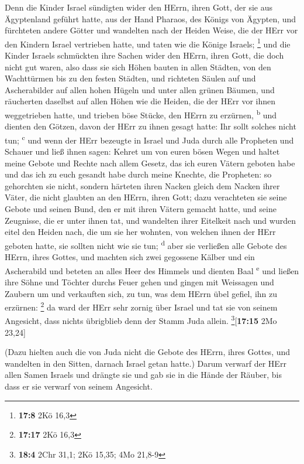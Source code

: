  Denn die Kinder Israel sündigten wider den HErrn, ihren
Gott, der sie aus Ägyptenland geführt hatte, aus der Hand Pharaos, des
Königs von Ägypten, und fürchteten andere Götter  und
wandelten nach der Heiden Weise, die der HErr vor den Kindern Israel
vertrieben hatte, und taten wie die Könige Israels; \footnote{\textbf{17:8}
  2Kö 16,3}  und die Kinder Israels schmückten ihre Sachen
wider den HErrn, ihren Gott, die doch nicht gut waren, also dass sie
sich Höhen bauten in allen Städten, von den Wachttürmen bis zu den
festen Städten,  und richteten Säulen auf und
Ascherabilder auf allen hohen Hügeln und unter allen grünen Bäumen,
 und räucherten daselbst auf allen Höhen wie die Heiden,
die der HErr vor ihnen weggetrieben hatte, und trieben böse Stücke, den
HErrn zu erzürnen, \textsuperscript{b}  und dienten den
Götzen, davon der HErr zu ihnen gesagt hatte: Ihr sollt solches nicht
tun; \textsuperscript{c}  und wenn der HErr bezeugte in
Israel und Juda durch alle Propheten und Schauer und ließ ihnen sagen:
Kehret um von euren bösen Wegen und haltet meine Gebote und Rechte nach
allem Gesetz, das ich euren Vätern geboten habe und das ich zu euch
gesandt habe durch meine Knechte, die Propheten:  so
gehorchten sie nicht, sondern härteten ihren Nacken gleich dem Nacken
ihrer Väter, die nicht glaubten an den HErrn, ihren Gott;
 dazu verachteten sie seine Gebote und seinen Bund, den
er mit ihren Vätern gemacht hatte, und seine Zeugnisse, die er unter
ihnen tat, und wandelten ihrer Eitelkeit nach und wurden eitel den
Heiden nach, die um sie her wohnten, von welchen ihnen der HErr geboten
hatte, sie sollten nicht wie sie tun; \textsuperscript{d}
 aber sie verließen alle Gebote des HErrn, ihres Gottes,
und machten sich zwei gegossene Kälber und ein Ascherabild und beteten
an alles Heer des Himmels und dienten Baal \textsuperscript{e}
 und ließen ihre Söhne und Töchter durchs Feuer gehen und
gingen mit Weissagen und Zaubern um und verkauften sich, zu tun, was dem
HErrn übel gefiel, ihn zu erzürnen: \footnote{\textbf{17:17} 2Kö 16,3}
 da ward der HErr sehr zornig über Israel und tat sie von
seinem Angesicht, dass nichts übrigblieb denn der Stamm Juda allein.
\footnote{\textbf{18:4} 2Chr 31,1; 2Kö 15,35; 4Mo 21,8-9}{[}\textbf{17:15}
2Mo 23,24{]}

 (Dazu hielten auch die von Juda nicht die Gebote des
HErrn, ihres Gottes, und wandelten in den Sitten, darnach Israel getan
hatte.)  Darum verwarf der HErr allen Samen Israels und
drängte sie und gab sie in die Hände der Räuber, bis dass er sie verwarf
von seinem Angesicht.

